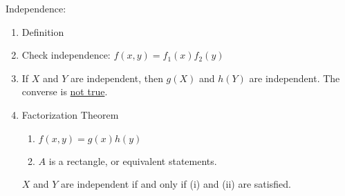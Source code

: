 Independence:
\begin{enumerate}[label=(\arabic*)]
    \item Definition
    \item Check independence: $ f(x,y)=f_1(x)f_2(y) $
    \item If $ X $ and $ Y $ are independent, then
          $ g(X) $ and $ h(Y) $ are independent. The converse
          is \underline{not true}.
    \item Factorization Theorem
          \begin{enumerate}[label=(\roman*)]
              \item $ f(x,y)=g(x)h(y) $
              \item $ A $ is a rectangle, or equivalent statements.
          \end{enumerate}
          $ X $ and $ Y $ are independent if and only if
          (i) and (ii) are satisfied.
\end{enumerate}
